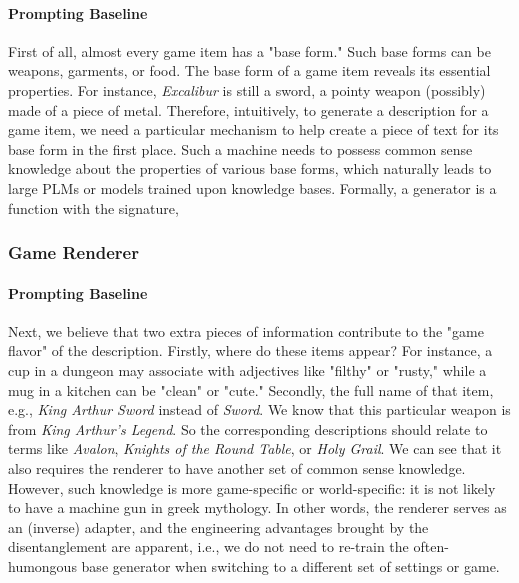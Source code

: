 \documentclass[11pt]{article}
\begin{document}
    \paragraph{Prompting Baseline} First of all, almost every game item has a "base form." Such base forms can be weapons, 
      garments, or food. The base form of a game item reveals its essential properties. 
      For instance, \textit{Excalibur} is still a sword, a pointy weapon (possibly) made of a 
      piece of metal. Therefore, intuitively, to generate a description for a game item, 
      we need a particular mechanism to help create a piece of text for its base form in 
      the first place. Such a machine needs to possess common sense knowledge about the 
      properties of various base forms, which naturally leads to large PLMs or models 
      trained upon knowledge bases. Formally, a generator is a function with the signature,
      
      
  \subsubsection{Game Renderer}
    \paragraph{Prompting Baseline} Next, we believe that two extra pieces of information contribute to the "game flavor" 
      of the description. Firstly, where do these items appear? For instance, a cup in a 
      dungeon may associate with adjectives like "filthy" or "rusty," while a mug in a 
      kitchen can be "clean" or "cute." Secondly, the full name of that item, e.g., 
      \textit{King Arthur Sword} instead of \textit{Sword}. We know that this particular weapon is from 
      \textit{King Arthur's Legend}. So the corresponding descriptions should relate to terms like 
      \textit{Avalon}, \textit{Knights of the Round Table}, or \textit{Holy Grail}. We can see that it also requires 
      the renderer to have another set of common sense knowledge. However, such knowledge 
      is more game-specific or world-specific: it is not likely to have a machine gun in 
      greek mythology. In other words, the renderer serves as an (inverse) adapter, and 
      the engineering advantages brought by the disentanglement are apparent, i.e., we do 
      not need to re-train the often-humongous base generator when switching to a different 
      set of settings or game. 
      
      
\end{document}
